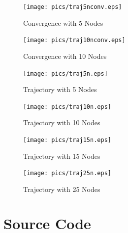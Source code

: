\documentclass{article}
\begin{document}
\begin{figure}
\texttt{[image: pics/traj5nconv.eps]} 
\caption{Convergence with 5 Nodes}\label{fig:conv5}
\end{figure}

\begin{figure}
\texttt{[image: pics/traj10nconv.eps]}
\caption{Convergence with 10 Nodes}\label{fig:conv10}
\end{figure}

\onecolumn
\begin{figure}
\texttt{[image: pics/traj5n.eps]}
\caption{Trajectory with 5 Nodes}\label{fig:5nt}
\end{figure}

\begin{figure}
\texttt{[image: pics/traj10n.eps]}
\caption{Trajectory with 10 Nodes}\label{fig:10nt}
\end{figure}

\begin{figure}
\texttt{[image: pics/traj15n.eps]}
\caption{Trajectory with 15 Nodes}\label{fig:15nt}
\end{figure}

\begin{figure}
\texttt{[image: pics/traj25n.eps]}
\caption{Trajectory with 25 Nodes}\label{fig:25nt}
\end{figure}

\twocolumn



\section{Source Code}


\end{document}
